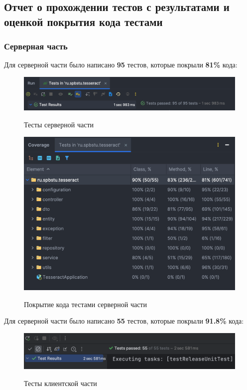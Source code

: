 \documentclass[a4paper, 14pt]{article}
\begin{document}
\subsection{Отчет о прохождении тестов с результатами и оценкой покрытия кода тестами}

\subsubsection{Серверная часть}

Для серверной части было написано \textbf{95} тестов, которые покрыли \textbf{81\%} кода:

\begin{figure}[H]
    \centering
    \includegraphics[width=13cm]{resources/2.png}\\
    \caption{Тесты серверной части}
\end{figure}

\begin{figure}[H]
    \centering
    \includegraphics[width=13cm]{resources/3.png}\\
    \caption{Покрытие кода тестами серверной части}
\end{figure}


Для серверной части было написано \textbf{55} тестов, которые покрыли \textbf{91.8\%} кода:

\begin{figure}[H]
    \centering
    \includegraphics[width=13cm]{resources/4.png}\\
    \caption{Тесты клиентской части}
\end{figure}
\end{document}
